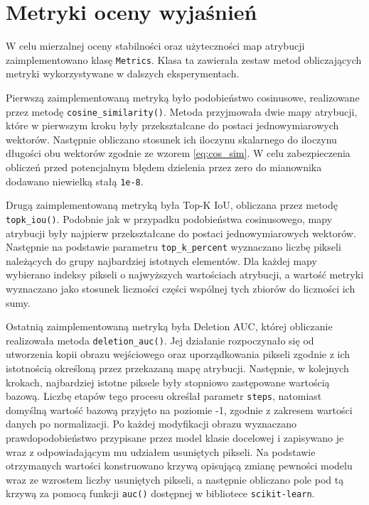 \section{Metryki oceny wyjaśnień}
\label{sec:metryki_oceny_wyjaśnien}

W celu mierzalnej oceny stabilności oraz użyteczności map atrybucji zaimplementowano klasę \texttt{Metrics}. Klasa ta zawierała zestaw metod obliczających metryki wykorzystywane w dalszych eksperymentach. 

Pierwszą zaimplementowaną metryką było podobieństwo cosinusowe, realizowane przez metodę \texttt{cosine\_similarity()}. Metoda przyjmowała dwie mapy atrybucji, które w pierwszym kroku były przekształcane do postaci jednowymiarowych wektorów. Następnie obliczano stosunek ich iloczynu skalarnego do iloczynu długości obu wektorów zgodnie ze wzorem \ref{eq:cos_sim}. W celu zabezpieczenia obliczeń przed potencjalnym błędem dzielenia przez zero do mianownika dodawano niewielką stałą \texttt{1e-8}.

Drugą zaimplementowaną metryką była Top-K IoU, obliczana przez metodę \texttt{topk\_iou()}. Podobnie jak w przypadku podobieństwa cosinusowego, mapy atrybucji były najpierw przekształcane do postaci jednowymiarowych wektorów. Następnie na podstawie parametru \texttt{top\_k\_percent} wyznaczano liczbę pikseli należących do grupy najbardziej istotnych elementów. Dla każdej mapy wybierano indeksy pikseli o najwyższych wartościach atrybucji, a wartość metryki wyznaczano jako stosunek liczności części wspólnej tych zbiorów do liczności ich sumy.

Ostatnią zaimplementowaną metryką była Deletion AUC, której obliczanie realizowała metoda \texttt{deletion\_auc()}. Jej działanie rozpoczynało się od utworzenia kopii obrazu wejściowego oraz uporządkowania pikseli zgodnie z ich istotnością określoną przez przekazaną mapę atrybucji. Następnie, w kolejnych krokach, najbardziej istotne piksele były stopniowo zastępowane wartością bazową. Liczbę etapów tego procesu określał parametr \texttt{steps}, natomiast domyślną wartość bazową przyjęto na poziomie -1, zgodnie z zakresem wartości danych po normalizacji.
Po każdej modyfikacji obrazu wyznaczano prawdopodobieństwo przypisane przez model klasie docelowej i zapisywano je wraz z odpowiadającym mu udziałem usuniętych pikseli. Na podstawie otrzymanych wartości konstruowano krzywą opisującą zmianę pewności modelu wraz ze wzrostem liczby usuniętych pikseli, a następnie obliczano pole pod tą krzywą za pomocą funkcji \texttt{auc()} dostępnej w bibliotece \texttt{scikit-learn}.

